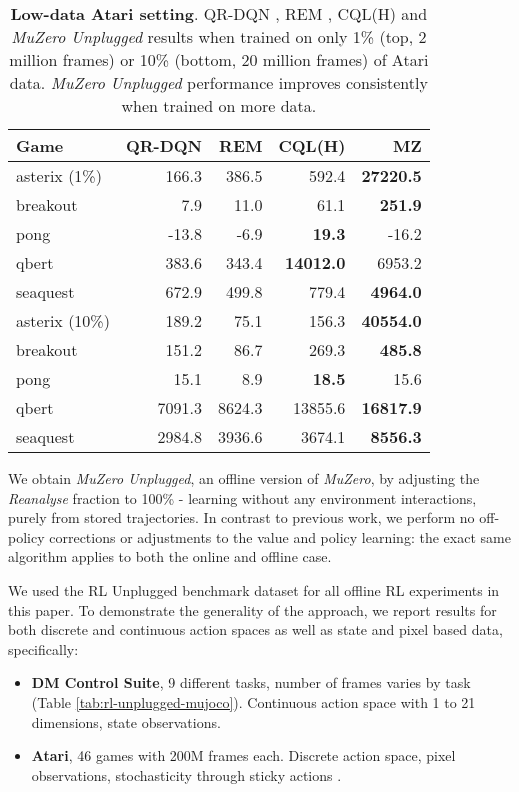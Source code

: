 \documentclass{article}
\newcommand{\muzero}{\emph{MuZero}}
\newcommand{\reanalyse}{\emph{Reanalyse}}
\newcommand{\mzunplugged}{\emph{MuZero Unplugged}}
\begin{document}
\begin{table}
\begin{center}
\begin{tabularx}{0.95\columnwidth}{l@{\hspace{-5pt}}rrrr}
\toprule
Game & QR-DQN & REM & CQL(H) & MZ \\

\midrule
asterix (1\%) & 166.3 & 386.5 & 592.4 & \textbf{27220.5}\\
breakout & 7.9 & 11.0 & 61.1 & \textbf{251.9}\\
pong & -13.8 & -6.9 & \textbf{19.3} & -16.2\\
qbert & 383.6 & 343.4 & \textbf{14012.0} & 6953.2\\
seaquest & 672.9 & 499.8 & 779.4 & \textbf{4964.0}\\
\midrule
asterix (10\%) & 189.2 & 75.1 & 156.3 & \textbf{40554.0}\\
breakout & 151.2 & 86.7 & 269.3 & \textbf{485.8}\\
pong & 15.1 & 8.9 & \textbf{18.5} & 15.6\\
qbert & 7091.3 & 8624.3 & 13855.6 & \textbf{16817.9}\\
seaquest & 2984.8 & 3936.6 & 3674.1 & \textbf{8556.3}\\
\bottomrule
\end{tabularx}
\end{center}
 \caption{
\label{tab:atari-low-data}
\textbf{Low-data Atari setting}. QR-DQN \cite{qr-dqn}, REM \cite{agarwal2020optimistic}, CQL(H) \cite{kumar2020conservative} and \mzunplugged{} results when trained on only 1\% (top, 2 million frames) or 10\% (bottom, 20 million frames) of Atari data. \mzunplugged{} performance improves consistently when trained on more data.
}
\end{table}



We obtain \mzunplugged{}, an offline version of \muzero{}, by adjusting the \reanalyse{} fraction to 100\% - learning without any environment interactions, purely from stored trajectories. In contrast to previous work, we perform no off-policy corrections or adjustments to the value and policy learning: the exact same algorithm applies to both the online and offline case.

We used the RL Unplugged \cite{rl_unplugged} benchmark dataset for all offline RL experiments in this paper. To demonstrate the generality of the approach, we report results for both discrete and continuous action spaces as well as state and pixel based data, specifically:
\begin{itemize}
\setlength\itemsep{0em}
\item \textbf{DM Control Suite}, 9 different tasks, number of frames varies by task (Table \ref{tab:rl-unplugged-mujoco}). Continuous action space with 1 to 21 dimensions, state observations.
\item \textbf{Atari}, 46 games with 200M frames each. Discrete action space, pixel observations, stochasticity through sticky actions \cite{Marlos2017Atari}.
\end{itemize}
\end{document}
